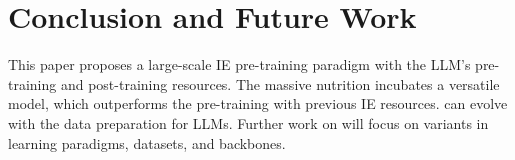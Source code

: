 \section{Conclusion and Future Work}

This paper proposes a large-scale IE pre-training paradigm with the LLM's pre-training and post-training resources. The massive nutrition incubates a versatile \our model, which outperforms the pre-training with previous IE resources. \our can evolve with the data preparation for LLMs.
Further work on \our will focus on variants in learning paradigms, datasets, and backbones.

